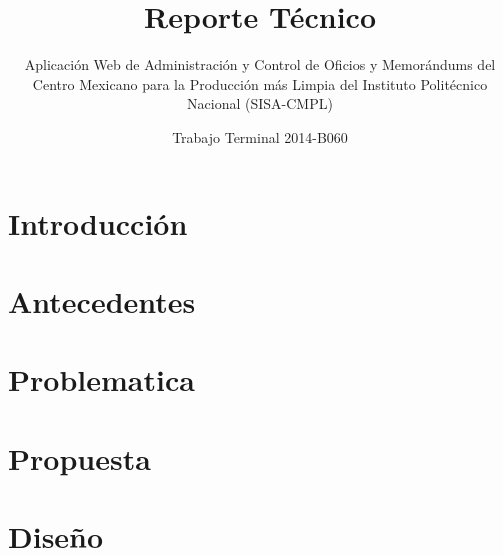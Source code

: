 \documentclass[oneside,10pt]{book}
\title{Reporte Técnico}
\subtitle{Aplicación Web de Administración y Control de Oficios y Memorándums del Centro Mexicano para la Producción más Limpia del Instituto Politécnico Nacional (SISA-CMPL)}
\author{Trabajo Terminal 2014-B060}
\begin{document}
\maketitle
\thispagestyle{empty}

\frontmatter
\tableofcontents

\mainmatter

\chapter{Introducción}


\chapter{Antecedentes}




\chapter{Problematica}


\chapter{Propuesta}


\chapter{Diseño}




\end{document}
